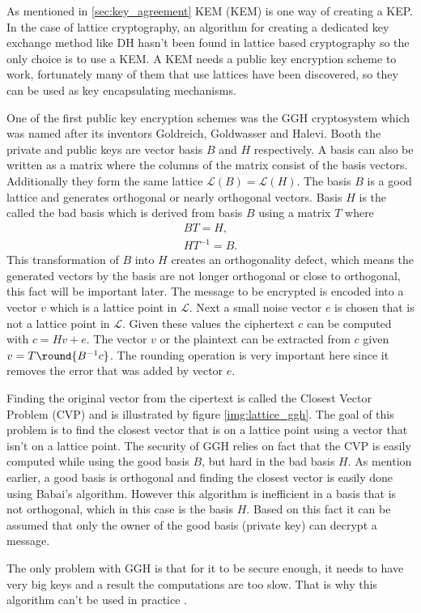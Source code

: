 

As mentioned in \ref{sec:key_agreement} KEM (\acl{KEM}) is one way of creating a KEP. In the case of lattice cryptography, an algorithm for creating a dedicated key exchange method like DH hasn't been found in lattice based cryptography so the only choice is to use a KEM. A KEM needs a public key encryption scheme to work, fortunately many of them that use lattices have been discovered, so they can be used as key encapsulating mechanisms. 

One of the first public key encryption schemes was the GGH cryptosystem which was named after its inventors Goldreich, Goldwasser and Halevi. Booth the private and public keys are vector basis $B$ and $H$ respectively. A basis can also be written as a matrix where the columns of the matrix consist of the basis vectors. Additionally they form the same lattice $\mathcal{L}(B)=\mathcal{L}(H)$. The basis $B$ is a good lattice and generates orthogonal or nearly orthogonal vectors. Basis $H$ is the called the bad basis which is derived from basis $B$ using a matrix $T$ where
\begin{equation}
  \begin{aligned}
    BT=H, \\
    HT^{-1}=B.
  \end{aligned}
\end{equation}
This transformation of $B$ into $H$ creates an orthogonality defect, which means the generated vectors by the basis are not longer orthogonal or close to orthogonal, this fact will be important later. The message to be encrypted is encoded into a vector $v$ which is a lattice point in $\mathcal{L}$. Next a small noise vector $e$ is chosen that is not a lattice point in $\mathcal{L}$. Given these values the ciphertext $c$ can be computed with $c = Hv + e$. The vector $v$ or the plaintext can be extracted from $c$ given $v=T \round{B^{-1}c}$. The rounding operation is very important here since it removes the error that was added by vector $e$. \cite{Bernstein2009}\cite{Goldreich1997}


Finding the original vector from the cipertext is called the Closest Vector Problem (CVP) and is illustrated by figure \ref{img:lattice_ggh}. The goal of this problem is to find the closest vector that is on a lattice point using a vector that isn't on a lattice point. The security of GGH relies on fact that the CVP is easily computed while using the good basis $B$, but hard in the bad basis $H$. As mention earlier, a good basis is orthogonal and finding the closest vector is easily done using Babai's algorithm. However this algorithm is inefficient in a basis that is not orthogonal, which in this case is the basis $H$. Based on this fact it can be assumed that only the owner of the good basis (private key) can decrypt a message. \cite{Goldreich1997} 

The only problem with GGH is that for it to be secure enough, it needs to have very big keys and a result the computations are too slow. That is why this algorithm can't be used in practice \cite{Bernstein2009}.

